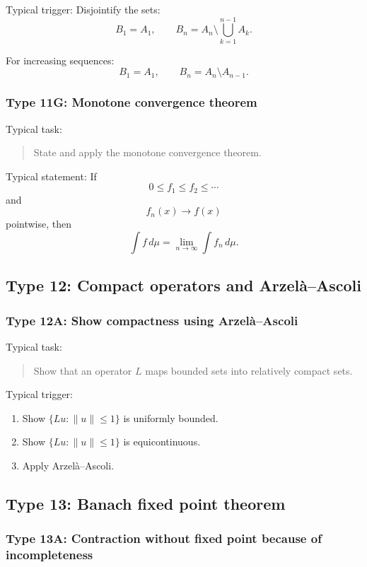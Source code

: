 Typical trigger: Disjointify the sets:
\[
    B_1=A_1,\qquad
    B_n=A_n\setminus \bigcup_{k=1}^{n-1}A_k.
\]

For increasing sequences:
\[
    B_1=A_1,\qquad
    B_n=A_n\setminus A_{n-1}.
\]

\subsubsection*{Type 11G: Monotone convergence theorem}

Typical task:
\begin{quote}
    State and apply the monotone convergence theorem.
\end{quote}

Typical statement:
If
\[
    0\leq f_1\leq f_2\leq \cdots
\]
and
\[
    f_n(x)\to f(x)
\]
pointwise, then
\[
    \int f\,d\mu
    =
    \lim_{n\to\infty}\int f_n\,d\mu.
\]

\subsection{Type 12: Compact operators and Arzelà--Ascoli}

\subsubsection*{Type 12A: Show compactness using Arzelà--Ascoli}

Typical task:
\begin{quote}
    Show that an operator $L$ maps bounded sets into relatively compact sets.
\end{quote}

Typical trigger:
\begin{enumerate}
    \item Show $\{Lu:\|u\|\leq 1\}$ is uniformly bounded.
    \item Show $\{Lu:\|u\|\leq 1\}$ is equicontinuous.
    \item Apply Arzelà--Ascoli.
\end{enumerate}

\subsection{Type 13: Banach fixed point theorem}

\subsubsection*{Type 13A: Contraction without fixed point because of incompleteness}

